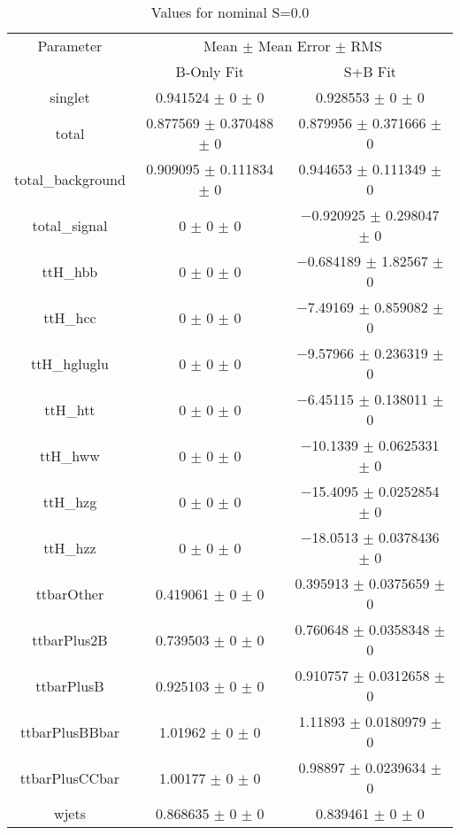 \begin{table}
\centering
\caption{Values for nominal S=0.0}
\begin{tabular}{ccc}
\toprule
Parameter & \multicolumn{2}{c}{Mean $\pm$ Mean Error $\pm$ RMS}\\
 & B-Only Fit & S+B Fit\\
\midrule
singlet & \num{0.941524} $\pm$ \num{0} $\pm$ \num{0} & \num{0.928553} $\pm$ \num{0} $\pm$ \num{0}\\
total & \num{0.877569} $\pm$ \num{0.370488} $\pm$ \num{0} & \num{0.879956} $\pm$ \num{0.371666} $\pm$ \num{0}\\
total\_background & \num{0.909095} $\pm$ \num{0.111834} $\pm$ \num{0} & \num{0.944653} $\pm$ \num{0.111349} $\pm$ \num{0}\\
total\_signal & \num{0} $\pm$ \num{0} $\pm$ \num{0} & \num{-0.920925} $\pm$ \num{0.298047} $\pm$ \num{0}\\
ttH\_hbb & \num{0} $\pm$ \num{0} $\pm$ \num{0} & \num{-0.684189} $\pm$ \num{1.82567} $\pm$ \num{0}\\
ttH\_hcc & \num{0} $\pm$ \num{0} $\pm$ \num{0} & \num{-7.49169} $\pm$ \num{0.859082} $\pm$ \num{0}\\
ttH\_hgluglu & \num{0} $\pm$ \num{0} $\pm$ \num{0} & \num{-9.57966} $\pm$ \num{0.236319} $\pm$ \num{0}\\
ttH\_htt & \num{0} $\pm$ \num{0} $\pm$ \num{0} & \num{-6.45115} $\pm$ \num{0.138011} $\pm$ \num{0}\\
ttH\_hww & \num{0} $\pm$ \num{0} $\pm$ \num{0} & \num{-10.1339} $\pm$ \num{0.0625331} $\pm$ \num{0}\\
ttH\_hzg & \num{0} $\pm$ \num{0} $\pm$ \num{0} & \num{-15.4095} $\pm$ \num{0.0252854} $\pm$ \num{0}\\
ttH\_hzz & \num{0} $\pm$ \num{0} $\pm$ \num{0} & \num{-18.0513} $\pm$ \num{0.0378436} $\pm$ \num{0}\\
ttbarOther & \num{0.419061} $\pm$ \num{0} $\pm$ \num{0} & \num{0.395913} $\pm$ \num{0.0375659} $\pm$ \num{0}\\
ttbarPlus2B & \num{0.739503} $\pm$ \num{0} $\pm$ \num{0} & \num{0.760648} $\pm$ \num{0.0358348} $\pm$ \num{0}\\
ttbarPlusB & \num{0.925103} $\pm$ \num{0} $\pm$ \num{0} & \num{0.910757} $\pm$ \num{0.0312658} $\pm$ \num{0}\\
ttbarPlusBBbar & \num{1.01962} $\pm$ \num{0} $\pm$ \num{0} & \num{1.11893} $\pm$ \num{0.0180979} $\pm$ \num{0}\\
ttbarPlusCCbar & \num{1.00177} $\pm$ \num{0} $\pm$ \num{0} & \num{0.98897} $\pm$ \num{0.0239634} $\pm$ \num{0}\\
wjets & \num{0.868635} $\pm$ \num{0} $\pm$ \num{0} & \num{0.839461} $\pm$ \num{0} $\pm$ \num{0}\\
\bottomrule
\end{tabular}
\end{table}